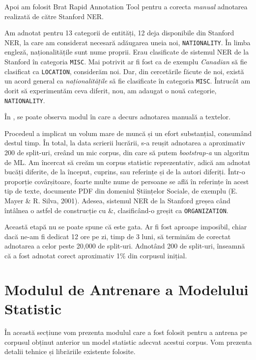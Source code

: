 Apoi am folosit Brat Rapid Annotation Tool pentru a corecta \textit{manual} adnotarea realizată de către Stanford NER.

Am adnotat pentru 13 categorii de entități, 12 deja disponibile din Stanford NER, la care am considerat necesară adăugarea uneia noi, \texttt{NATIONALITY}. În limba engleză, naționalitățile sunt nume proprii. Erau clasificate de sistemul NER de la Stanford în categoria \texttt{MISC}. Mai potrivit ar fi fost ca de exemplu \textit{Canadian} să fie clasificat ca \texttt{LOCATION}, considerăm noi. Dar, din cercetările făcute de noi, există un acord general ca \textit{naționalitățile} să fie clasificate în categoria \texttt{MISC}. Întrucât am dorit să experimentăm ceva diferit, nou, am adaugat o nouă categorie, \texttt{NATIONALITY}.

În , se poate observa modul în care a decurs adnotarea manuală a textelor. 


Procedeul a implicat un volum mare de muncă și un efort substanțial, consumând destul timp. În total, la data scrierii lucrării, s-a reușit adnotarea a aproximativ 200 de split-uri, creând un mic corpus, din care să putem \textit{bootstrap-a} un algoritm de ML. Am încercat să creăm un corpus statistic reprezentativ, adică am adnotat bucăți diferite, de la început, cuprins, sau referințe și de la autori diferiți. Într-o proporție covârșitoare, foarte multe nume de persoane se află în referințe în acest tip de texte, documente PDF din domeniul Științelor Sociale, de exemplu (E. Mayer \& R. Silva, 2001). Adesea, sistemul NER de la Stanford greșea când întâlnea o astfel de construcție cu \&, clasificând-o greșit ca \texttt{ORGANIZATION}.

Această etapă nu se poate spune că este gata. Ar fi fost aproape imposibil, chiar dacă ne-am fi dedicat 12 ore pe zi, timp de 3 luni, să terminăm de corectat adnotarea a celor peste 20,000 de split-uri. Adnotând 200 de split-uri, înseamnă că a fost adnotat corect aproximativ 1\% din corpusul inițial.

\section {Modulul de Antrenare a Modelului Statistic}

În această secțiune vom prezenta modulul care a fost folosit pentru a antrena pe corpusul obținut anterior un model statistic adecvat acestui corpus. Vom prezenta detalii tehnice și librăriile existente folosite.

